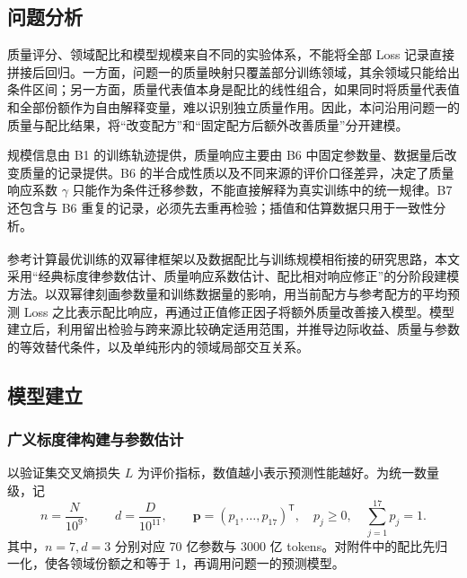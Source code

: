 \documentclass[bwprint]{gmcmthesis}
\numberwithin{equation}{section}
\numberwithin{figure}{section}
\numberwithin{table}{section}
\begin{document}
    \subsection{问题分析}
    质量评分、领域配比和模型规模来自不同的实验体系，不能将全部 Loss 记录直接拼接后回归。一方面，问题一的质量映射只覆盖部分训练领域，其余领域只能给出条件区间；另一方面，质量代表值本身是配比的线性组合，如果同时将质量代表值和全部份额作为自由解释变量，难以识别独立质量作用。因此，本问沿用问题一的质量与配比结果，将“改变配方”和“固定配方后额外改善质量”分开建模。

    规模信息由 B1 的训练轨迹提供，质量响应主要由 B6 中固定参数量、数据量后改变质量的记录提供。B6 的半合成性质以及不同来源的评价口径差异，决定了质量响应系数 $\gamma$ 只能作为条件迁移参数，不能直接解释为真实训练中的统一规律。B7 还包含与 B6 重复的记录，必须先去重再检验；插值和估算数据只用于一致性分析。

    参考计算最优训练的双幂律框架\textsuperscript{\cite{hoffmann2022chinchilla}}以及数据配比与训练规模相衔接的研究思路\textsuperscript{\cite{ye2025mixing}}，本文采用“经典标度律参数估计、质量响应系数估计、配比相对响应修正”的分阶段建模方法。以双幂律刻画参数量和训练数据量的影响，用当前配方与参考配方的平均预测 Loss 之比表示配比响应，再通过正值修正因子将额外质量改善接入模型。模型建立后，利用留出检验与跨来源比较确定适用范围，并推导边际收益、质量与参数的等效替代条件，以及单纯形内的领域局部交互关系。

    \subsection{模型建立}
        \subsubsection{广义标度律构建与参数估计}
        以验证集交叉熵损失 $L$ 为评价指标，数值越小表示预测性能越好。为统一数量级，记
        \begin{equation}
         n=\frac{N}{10^9},\qquad d=\frac{D}{10^{11}},\qquad
         \bm p=(p_1,\ldots,p_{17})^\mathsf T,\quad
         p_j\geq0,\quad\sum_{j=1}^{17}p_j=1.
         \label{eq:p2_units}
        \end{equation}
        其中，$n=7,d=3$ 分别对应 70 亿参数与 3000 亿 tokens。对附件中的配比先归一化，使各领域份额之和等于 1，再调用问题一的预测模型。
        
\end{document}
